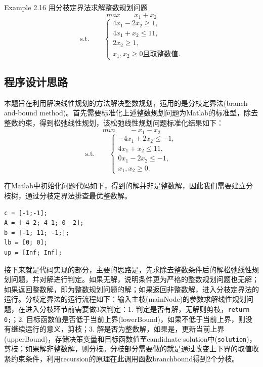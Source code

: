 \documentclass[a4paper, 12pt]{ctexart}  %
\begin{document}
Example 2.16  用分枝定界法求解整数规划问题
\begin{equation*}
max \qquad x_{1}+x_{2}
\end{equation*}
\begin{equation*}
\text{s.t.} \qquad 
\begin{cases}
4x_{1}-2x_{2}\geq 1, \\
4x_{1}+x_{2}\leq 11,  \\
2x_{2}\geq 1,  \\
x_{1}, x_{2}\geq 0\text{且取整数值}.
\end{cases}
\end{equation*}

\subsection{程序设计思路}
本题旨在利用解决线性规划的方法解决整数规划，运用的是分枝定界法(branch-and-bound method)。首先需要标准化上述整数规划问题为Matlab的标准型，除去整数约束，得到松弛线性规划，该松弛线性规划问题标准化结果如下：
\begin{equation*} %
min \qquad -x_{1}-x_{2}
\end{equation*}
\begin{equation*} %
\text{s.t.} \qquad 
\begin{cases}
-4x_{1}+2x_{2}\leq -1, \\
4x_{1}+x_{2}\leq 11,  \\
0x_{1}-2x_{2}\leq -1,  \\
x_{1}, x_{2}\geq 0.
\end{cases}
\end{equation*}

在Matlab中初始化问题代码如下，得到的解并非是整数解，因此我们需要建立分枝树，通过分枝定界法排查最优整数解。
\begin{verbatim}
c = [-1;-1];
A = [-4 2; 4 1; 0 -2];
b = [-1; 11; -1;];
lb = [0; 0];
up = [Inf; Inf];
\end{verbatim}

接下来就是代码实现的部分，主要的思路是，先求除去整数条件后的解松弛线性规划问题，并对解进行判定。如果无解，说明条件更为严格的整数规划问题也无解；如果返回整数解，即为整数规划问题的解；如果返回非整数解，进入分枝定界法的运行。分枝定界法的运行流程如下：输入主枝(mainNode)的参数求解线性规划问题，在进入分枝环节前需要做3次判定：1. 判定是否有解，无解则剪枝，\verb|return 0;|；2. 目标函数值是否低于当前上界(lowerBound)，如果不低于当前上界，则没有继续运行的意义，剪枝；3. 解是否为整数解，如果是，更新当前上界(upperBound)，存储决策变量和目标函数值至candidnate solution中(\verb|solution|)，剪枝；如果解非整数解，则分枝。分枝部分需要做的就是通过改变上下界的取值收紧约束条件，利用recursion的原理在此调用函数branchbound得到2个分枝。
\end{document}
